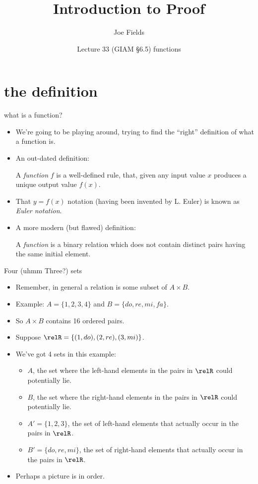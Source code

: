 \documentclass[handout,landscape]{beamer}
\author{Joe Fields}
\title{Introduction to Proof}
\date{Lecture 33 (GIAM \S 6.5) \newline functions}
\institute[SCSU]{ {\tt fieldsj1@southernct.edu} }
\begin{document}
\begin{frame}[plain]
  \titlepage
\end{frame}

\section{the definition}

\begin{frame}{what is a function?}
\begin{itemize}
\item We're going to be playing around, trying to find the ``right'' definition of what a function is. \pause
\item An out-dated definition:\pause \newline
\begin{defi}
 A \emph{function} $f$ is a well-defined rule, that, given any input
value $x$ produces a unique output value $f(x)$.
\end{defi}
\pause
\item That $y=f(x)$ notation (having been invented by L. Euler) is known as {\em Euler notation}. \pause
\item A more modern (but flawed) definition:\pause
\begin{defi}
 A \emph{function} is a binary relation which does not contain
distinct pairs having the same initial element.
\end{defi}
\end{itemize}
\end{frame}

\begin{frame}{Four (uhmm Three?) sets}
\begin{itemize}
\item Remember, in general a relation is some subset of $A \times B$. \pause
\item Example: $A = \{1, 2, 3, 4\}$ and $B = \{do, re, mi, fa \}$.  \pause
\item So $A\times B$ contains 16 ordered pairs. \pause
\item Suppose $\relR = \{ (1,do), (2, re), (3, mi) \}$. \pause
\item We've got 4 sets in this example: \pause
\begin{itemize}
  \item $A$, the set where the left-hand elements in the pairs in $\relR$ could potentially lie. \pause
  \item $B$, the set where the right-hand elements in the pairs in $\relR$ could potentially lie.\pause
  \item $A' = \{1, 2, 3\}$, the set of left-hand elements that actually occur in the pairs in $\relR$. \pause
  \item $B' = \{do, re, mi\}$, the set of right-hand elements that actually occur in the pairs in $\relR$. \pause
\end{itemize}
\item Perhaps a picture is in order.
\end{itemize}
\end{frame}
\end{document}
